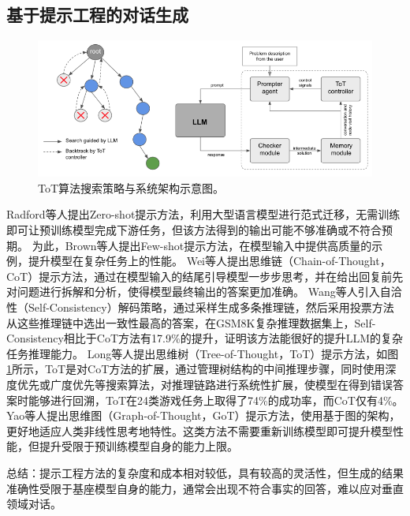 \subsection{基于提示工程的对话生成}

\begin{figure}[htbp]
	\centering
	\includegraphics[scale=0.6]{Fig/tot.png}
	\caption{\label{tot}ToT算法搜索策略与系统架构示意图\cite{DBLP:journals/corr/abs-2305-08291}。}
\end{figure}

Radford等人\cite{radford2019language}提出Zero-shot提示方法，利用大型语言模型进行范式迁移，无需训练即可让预训练模型完成下游任务，但该方法得到的输出可能不够准确或不符合预期。
为此，Brown等人\cite{DBLP:conf/nips/BrownMRSKDNSSAA20}提出Few-shot提示方法，在模型输入中提供高质量的示例，提升模型在复杂任务上的性能。
Wei等人\cite{DBLP:conf/nips/Wei0SBIXCLZ22}提出思维链（Chain-of-Thought，CoT）提示方法，通过在模型输入的结尾引导模型一步步思考，并在给出回复前先对问题进行拆解和分析，使得模型最终输出的答案更加准确。
Wang等人\cite{DBLP:conf/iclr/0002WSLCNCZ23}引入自洽性（Self-Consistency）解码策略，通过采样生成多条推理链，然后采用投票方法从这些推理链中选出一致性最高的答案，在GSM8K复杂推理数据集上，Self-Consistency相比于CoT方法有17.9\%的提升，证明该方法能很好的提升LLM的复杂任务推理能力。
Long等人\cite{DBLP:journals/corr/abs-2305-08291}提出思维树（Tree-of-Thought，ToT）提示方法，如图\ref{tot}所示，ToT是对CoT方法的扩展，通过管理树结构的中间推理步骤，同时使用深度优先或广度优先等搜索算法，对推理链路进行系统性扩展，使模型在得到错误答案时能够进行回溯，ToT在24类游戏任务上取得了74\%的成功率，而CoT仅有4\%。
Yao等人\cite{DBLP:journals/corr/abs-2305-16582}提出思维图（Graph-of-Thought，GoT）提示方法，使用基于图的架构，更好地适应人类非线性思考地特性。这类方法不需要重新训练模型即可提升模型性能，但提升受限于预训练模型自身的能力上限。

总结：提示工程方法的复杂度和成本相对较低，具有较高的灵活性，但生成的结果准确性受限于基座模型自身的能力，通常会出现不符合事实的回答，难以应对垂直领域对话。

